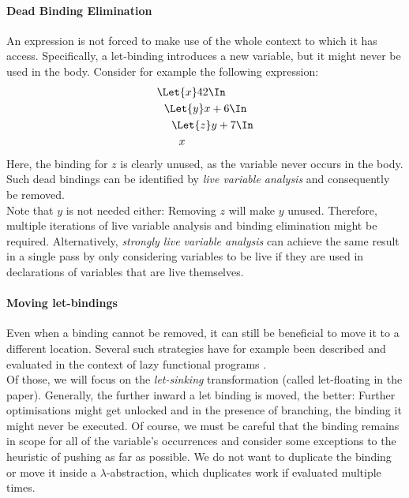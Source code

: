  \paragraph{Dead Binding Elimination}
    An expression is not forced to make use of the whole context to which it has access.
    Specifically, a let-binding introduces a new variable, but it might never be used
    in the body.
    Consider for example the following expression:
    \begin{align*}
      &\Let{x} 42 \In            \\
      &\ \ \Let{y} x + 6 \In     \\
      &\ \ \ \ \Let{z} y + 7 \In \\
      &\ \ \ \ \ \ x
    \end{align*}
    Here, the binding for $z$ is clearly unused, as the variable never occurs in the body.
    Such dead bindings can be identified by \emph{live variable analysis}
    and consequently be removed.
    \\
    Note that $y$ is not needed either: Removing $z$ will make $y$ unused.
    Therefore, multiple iterations of live variable analysis and binding elimination might be required.
    Alternatively, \emph{strongly live variable analysis} can achieve the same result in a single pass
    by only considering variables to be live
    if they are used in declarations of variables that are live themselves.
  \paragraph{Moving let-bindings}
    Even when a binding cannot be removed,
    it can still be beneficial to move it to a different location.
    Several such strategies have for example been described and evaluated
    in the context of lazy functional programs
    \cite{Jones1996LetFloating}.
    \\
    Of those, we will focus on the \emph{let-sinking} transformation
    (called let-floating in the paper).
    Generally, the further inward a let binding is moved, the better:
    Further optimisations might get unlocked and in the presence of branching,
    the binding it might never be executed.
    Of course, we must be careful that the binding remains in scope
    for all of the variable's occurrences
    and consider some exceptions to the heuristic of pushing as far as possible.
    We do not want to duplicate the binding
    or move it inside a $\lambda$-abstraction, which duplicates work
    if evaluated multiple times.

